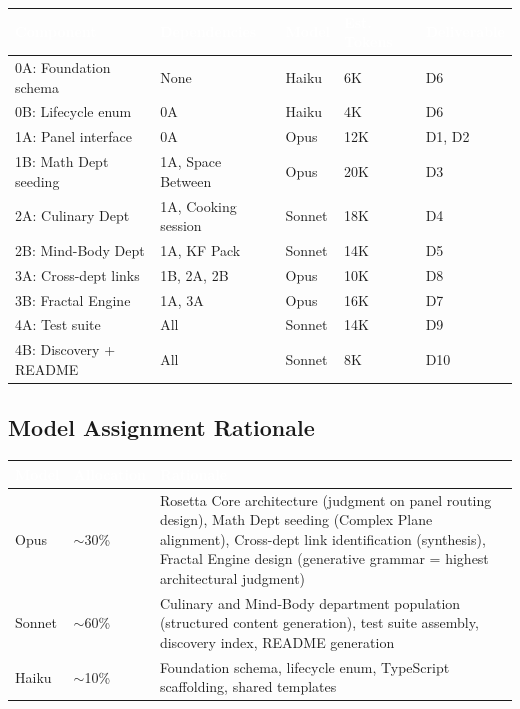 \documentclass[11pt,letterpaper]{article}
\newcommand{\tableheader}[1]{\textbf{\sffamily\textcolor{white}{#1}}}
\begin{document}
\begin{center}
\begin{tabularx}{\textwidth}{L{3cm}L{2.5cm}C{1.8cm}C{1.8cm}C{2cm}}
\toprule
{}
\tableheader{Component} & \tableheader{Dependencies} & \tableheader{Model} & \tableheader{Est. Tokens} & \tableheader{Deliverable} \\
\midrule
0A: Foundation schema & None & Haiku & 6K & D6 \\
0B: Lifecycle enum & 0A & Haiku & 4K & D6 \\
1A: Panel interface & 0A & Opus & 12K & D1, D2 \\
1B: Math Dept seeding & 1A, Space Between & Opus & 20K & D3 \\
2A: Culinary Dept & 1A, Cooking session & Sonnet & 18K & D4 \\
2B: Mind-Body Dept & 1A, KF Pack & Sonnet & 14K & D5 \\
3A: Cross-dept links & 1B, 2A, 2B & Opus & 10K & D8 \\
3B: Fractal Engine & 1A, 3A & Opus & 16K & D7 \\
4A: Test suite & All & Sonnet & 14K & D9 \\
4B: Discovery + README & All & Sonnet & 8K & D10 \\
\bottomrule
\end{tabularx}
\end{center}

\subsection{Model Assignment Rationale}

\begin{center}
\begin{tabularx}{\textwidth}{L{2cm}C{1.5cm}X}
\toprule
{}
\tableheader{Model} & \tableheader{Allocation} & \tableheader{Rationale} \\
\midrule
Opus & $\sim$30\% & Rosetta Core architecture (judgment on panel routing design), Math Dept seeding (Complex Plane alignment), Cross-dept link identification (synthesis), Fractal Engine design (generative grammar = highest architectural judgment) \\
Sonnet & $\sim$60\% & Culinary and Mind-Body department population (structured content generation), test suite assembly, discovery index, README generation \\
Haiku & $\sim$10\% & Foundation schema, lifecycle enum, TypeScript scaffolding, shared templates \\
\bottomrule
\end{tabularx}
\end{center}
\end{document}
